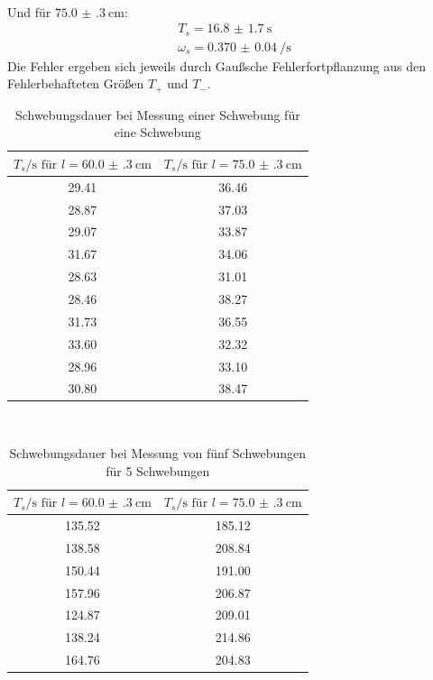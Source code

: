 \\
Und für $\SI{75.0(3)}{\centi\metre}$:
\begin{equation*}
  \begin{split}
  T_s = \SI{16.8(17)}{\second} \\
  \omega_s = \SI{0.370(40)}{\per\second}
\end{split}
\end{equation*}
Die Fehler ergeben sich jeweils durch Gaußsche Fehlerfortpflanzung aus den Fehlerbehafteten Größen $T_+$ und $T_-$.
\\
\begin{table}[b]
  \centering
  \caption{Schwebungsdauer bei Messung einer Schwebung für eine Schwebung}
  \label{tab:data3}
  \begin{tabular}{c c}
    \toprule
    $T_{s}/\si{\second} \text{ für } l=\SI{60.0(3)}{\centi\metre}$ & $T_{s}/\si{\second} \text{ für } l=\SI{75.0(3)}{\centi\metre}$ \\
    \midrule
    29.41 & 36.46 \\
    28.87 & 37.03 \\
    29.07 & 33.87 \\
    31.67 & 34.06 \\
    28.63 & 31.01 \\
    28.46 & 38.27 \\
    31.73 & 36.55 \\
    33.60 & 32.32 \\
    28.96 & 33.10 \\
    30.80 & 38.47 \\
    \bottomrule
  \end{tabular}
\end{table}
\\
\begin{table}[b]
  \centering
  \caption{Schwebungsdauer bei Messung von fünf Schwebungen für 5 Schwebungen}
  \label{tab:data4}
  \begin{tabular}{c c}
    \toprule
  $T_{s}/\si{\second} \text{ für } l=\SI{60.0(3)}{\centi\metre}$ & $T_{s}/\si{\second} \text{ für } l=\SI{75.0(3)}{\centi\metre}$ \\
    \midrule
    135.52 & 185.12 \\
    138.58 & 208.84 \\
    150.44 & 191.00 \\
    157.96 & 206.87 \\
    124.87 & 209.01 \\
    138.24 & 214.86 \\
    164.76 & 204.83 \\
    \bottomrule
  \end{tabular}
\end{table}
